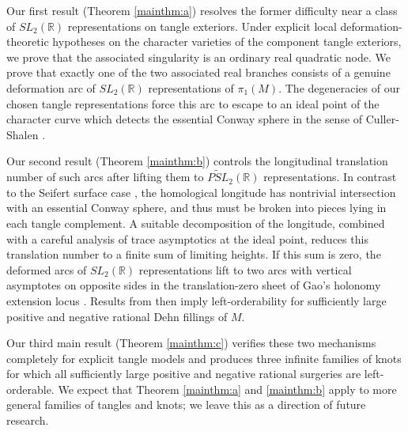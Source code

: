 \documentclass{article}
\theoremstyle{plain}
\theoremstyle{definition}
\theoremstyle{plain}
\theoremstyle{plain}
\theoremstyle{plain}
\theoremstyle{remark}
\theoremstyle{remark}
\theoremstyle{plain}
\theoremstyle{plain}
\newcounter{main}
\theoremstyle{plain}
\theoremstyle{plain}
\begin{document}
\medskip

Our first result (Theorem \ref{mainthm:a}) resolves the former difficulty near a class of $SL_2(\mathbb R)$ representations on tangle exteriors. Under explicit local deformation-theoretic hypotheses on the character varieties of the component tangle exteriors, we prove that the associated singularity is an ordinary real quadratic node. We prove that exactly one of the two associated real branches consists of a genuine deformation arc of $SL_2(\mathbb R)$ representations of $\pi_1(M)$. The degeneracies of our chosen tangle representations force this arc to escape to an ideal point of the character curve which detects the essential Conway sphere in the sense of Culler-Shalen \cite{cullershalen}. 

\medskip

Our second result (Theorem \ref{mainthm:b}) controls the longitudinal translation number of such arcs after lifting them to $\widetilde{PSL}_2(\mathbb R)$ representations. In contrast to the Seifert surface case \cite{WangDetectedSeifertSurfaces}, the homological longitude has nontrivial intersection with an essential Conway sphere, and thus must be broken into pieces lying in each tangle complement. A suitable decomposition of the longitude, combined with a careful analysis of trace asymptotics at the ideal point, reduces this translation number to a finite sum of limiting heights. If this sum is zero, the deformed arcs of $SL_2(\mathbb R)$ representations lift to two arcs with vertical asymptotes on opposite sides in the translation-zero sheet of Gao's holonomy extension locus \cite{gao}. Results from \cite{gao} then imply left-orderability for sufficiently large positive and negative rational Dehn fillings of $M$. 

\medskip

Our third main result (Theorem \ref{mainthm:c}) verifies these two mechanisms completely for explicit tangle models and produces three infinite families of knots for which all sufficiently large positive and negative rational surgeries are left-orderable. We expect that Theorem \ref{mainthm:a} and \ref{mainthm:b} apply to more general families of tangles and knots; we leave this as a direction of future research. 

\medskip
\end{document}
